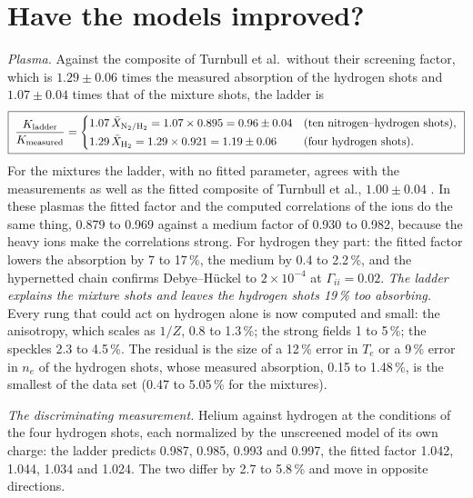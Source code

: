 \documentclass[11pt]{article}
\numberwithin{equation}{section}
\begin{document}
\section{Have the models improved?}
\label{sec:verdict}

{\noindent}\emph{Plasma.} Against the composite of Turnbull et al.\ without their screening factor,
which is $1.29\pm0.06$ times the measured absorption of the hydrogen shots and $1.07\pm0.04$ times
that of the mixture shots, the ladder is
\begin{equation}
\boxed{\;\frac{K_{\rm ladder}}{K_{\rm measured}}=
\begin{cases}
1.07\,\bar X_{\rm N_2/H_2}=1.07\times0.895=0.96\pm0.04 & \text{(ten nitrogen--hydrogen shots)},\\[2pt]
1.29\,\bar X_{\rm H_2}=1.29\times0.921=1.19\pm0.06 & \text{(four hydrogen shots)}.
\end{cases}\;}
\label{eq:verdict}
\end{equation}
For the mixtures the ladder, with no fitted parameter, agrees with the measurements as well as the
fitted composite of Turnbull et al., $1.00\pm0.04$ \cite{Turnbull2024}. In these plasmas the fitted
factor and the computed correlations of the ions do the same thing, 0.879 to 0.969 against a medium
factor of 0.930 to 0.982, because the heavy ions make the correlations strong. For hydrogen they part:
the fitted factor lowers the absorption by 7 to 17\,\%, the medium by 0.4 to 2.2\,\%, and the
hypernetted chain confirms Debye--H\"uckel to $2\times10^{-4}$ at $\Gamma_{ii}=0.02$. \emph{The ladder
explains the mixture shots and leaves the hydrogen shots 19\,\% too absorbing.} Every rung that
could act on hydrogen alone is now computed and small: the anisotropy, which scales as $1/Z$, 0.8 to
1.3\,\%; the strong fields 1 to 5\,\%; the speckles 2.3 to 4.5\,\%. The residual is the size of a 12\,\% error
in $T_e$ or a 9\,\% error in $n_e$ of the hydrogen shots, whose measured absorption, 0.15 to 1.48\,\%, is
the smallest of the data set (0.47 to 5.05\,\% for the mixtures).

{\noindent}\emph{The discriminating measurement.} Helium against hydrogen at the conditions of the
four hydrogen shots, each normalized by the unscreened model of its own charge: the ladder predicts
0.987, 0.985, 0.993 and 0.997, the fitted factor 1.042, 1.044, 1.034 and 1.024. The two differ by 2.7
to 5.8\,\% and move in opposite directions.
\end{document}
